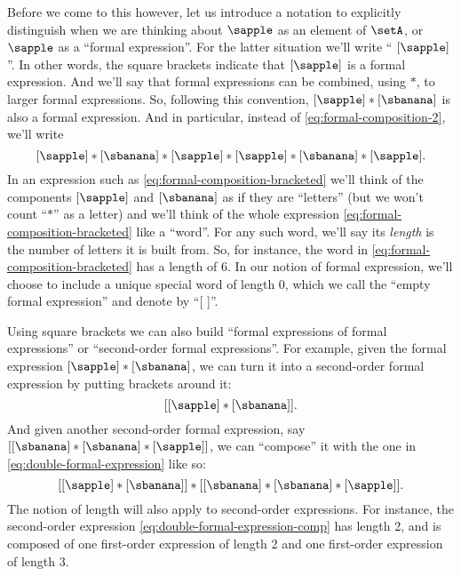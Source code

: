 Before we come to this however, let us introduce a notation to explicitly distinguish when we are thinking about $\sapple$ as an element of $\setA$, or $\sapple$ as a ``formal expression''.
For the latter situation we'll write `` $[\sapple]$ ''.
In other words, the square brackets indicate that $[\sapple]$ is a formal expression.
And we'll say that formal expressions can be combined, using $*$, to larger formal expressions.
So, following this convention, $[\sapple] * [\sbanana]$ is also a formal expression.
And in particular, instead of \cref{eq:formal-composition-2}, we'll write
\begin{equation}
    \label{eq:formal-composition-bracketed}
    [\sapple] * [\sbanana] * [\sapple] * [\sapple] * [\sbanana] * [\sapple].
\end{equation}
%
In an expression such as \cref{eq:formal-composition-bracketed} we'll think of the components $[\sapple]$ and $[\sbanana]$ as if they are ``letters'' (but we won't count ``$*$'' as a letter) and we'll think of the whole expression \cref{eq:formal-composition-bracketed} like a ``word''.
For any such word, we'll say its \emph{length} is the number of letters it is built from.
So, for instance, the word in \cref{eq:formal-composition-bracketed} has a length of $6$.
In our notion of formal expression, we'll choose to include a unique special word of length $0$, which we call the ``empty formal expression'' and denote by ``[ ]''.


Using square brackets we can also build ``formal expressions of formal expressions'' or ``second-order formal expressions''.
For example, given the formal expression $[\sapple] * [\sbanana]$, we can turn it into a second-order formal expression by putting brackets around it:
\begin{equation}
    \label{eq:double-formal-expression}
    [[\sapple] * [\sbanana]].
\end{equation}
And given another second-order formal expression, say $[[\sbanana] * [\sbanana] * [\sapple]]$, we can ``compose'' it with the one in \cref{eq:double-formal-expression} like so:
\begin{equation}
    \label{eq:double-formal-expression-comp}
    [[\sapple] * [\sbanana]] * [[\sbanana] * [\sbanana] * [\sapple]].
\end{equation}
The notion of length will also apply to second-order expressions.
For instance, the second-order expression \cref{eq:double-formal-expression-comp} has length 2, and is composed of one first-order expression of length 2 and one first-order expression of length 3.

